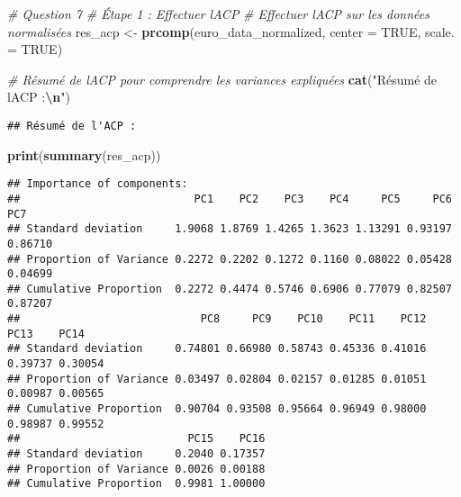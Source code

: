 \documentclass[
]{article}
\newenvironment{Shaded}{\begin{snugshade}}{\end{snugshade}}
\newcommand{\AttributeTok}[1]{\textcolor[rgb]{0.13,0.29,0.53}{#1}}
\newcommand{\CommentTok}[1]{\textcolor[rgb]{0.56,0.35,0.01}{\textit{#1}}}
\newcommand{\ConstantTok}[1]{\textcolor[rgb]{0.56,0.35,0.01}{#1}}
\newcommand{\FunctionTok}[1]{\textcolor[rgb]{0.13,0.29,0.53}{\textbf{#1}}}
\newcommand{\NormalTok}[1]{#1}
\newcommand{\OtherTok}[1]{\textcolor[rgb]{0.56,0.35,0.01}{#1}}
\newcommand{\SpecialCharTok}[1]{\textcolor[rgb]{0.81,0.36,0.00}{\textbf{#1}}}
\newcommand{\StringTok}[1]{\textcolor[rgb]{0.31,0.60,0.02}{#1}}
\begin{document}
\begin{Shaded}
\begin{Highlighting}[]
\CommentTok{\# Question 7 }
\CommentTok{\# Étape 1 : Effectuer l\textquotesingle{}ACP}
\CommentTok{\# Effectuer l\textquotesingle{}ACP sur les données normalisées}
\NormalTok{res\_acp }\OtherTok{\textless{}{-}} \FunctionTok{prcomp}\NormalTok{(euro\_data\_normalized, }\AttributeTok{center =} \ConstantTok{TRUE}\NormalTok{, }\AttributeTok{scale. =} \ConstantTok{TRUE}\NormalTok{)}

\CommentTok{\# Résumé de l\textquotesingle{}ACP pour comprendre les variances expliquées}
\FunctionTok{cat}\NormalTok{(}\StringTok{"Résumé de l\textquotesingle{}ACP :}\SpecialCharTok{\textbackslash{}n}\StringTok{"}\NormalTok{)}
\end{Highlighting}
\end{Shaded}

\begin{verbatim}
## Résumé de l'ACP :
\end{verbatim}

\begin{Shaded}
\begin{Highlighting}[]
\FunctionTok{print}\NormalTok{(}\FunctionTok{summary}\NormalTok{(res\_acp))}
\end{Highlighting}
\end{Shaded}

\begin{verbatim}
## Importance of components:
##                           PC1    PC2    PC3    PC4     PC5     PC6     PC7
## Standard deviation     1.9068 1.8769 1.4265 1.3623 1.13291 0.93197 0.86710
## Proportion of Variance 0.2272 0.2202 0.1272 0.1160 0.08022 0.05428 0.04699
## Cumulative Proportion  0.2272 0.4474 0.5746 0.6906 0.77079 0.82507 0.87207
##                            PC8     PC9    PC10    PC11    PC12    PC13    PC14
## Standard deviation     0.74801 0.66980 0.58743 0.45336 0.41016 0.39737 0.30054
## Proportion of Variance 0.03497 0.02804 0.02157 0.01285 0.01051 0.00987 0.00565
## Cumulative Proportion  0.90704 0.93508 0.95664 0.96949 0.98000 0.98987 0.99552
##                          PC15    PC16
## Standard deviation     0.2040 0.17357
## Proportion of Variance 0.0026 0.00188
## Cumulative Proportion  0.9981 1.00000
\end{verbatim}
\end{document}
